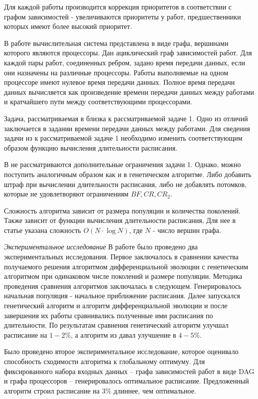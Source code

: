 \documentclass{article}
\begin{document}
Для каждой работы производится коррекция приоритетов в соответствии с графом зависимостей - увеличиваются приоритеты у работ, предшественники которых имеют более высокий приоритет. \par
В работе \cite{Krzysztof_2005} вычислительная система представлена в виде графа, вершинами которого являются процессоры. Дан ациклический граф зависимостей работ. Для каждой пары работ, соединенных ребром, задано время передачи данных, если они назначены на различные процессоры. Работы выполняемые на одном процессоре имеют нулевое время передачи данных. Полное время передачи данных вычисляется как произведение времени передачи данных между работами и кратчайшего пути между соответствующими процессорами.\par
Задача, рассматриваемая в \cite{Krzysztof_2005} близка к рассматриваемой задаче 1. Одно из отличий заключается в задании времени передачи данных между работами. Для сведения задачи из \cite{Krzysztof_2005} к рассматриваемой задаче 1 необходимо изменить соответствующим образом функцию вычисления длительности расписания. \par
В \cite{Krzysztof_2005} не рассматриваются дополнительные ограничения задачи 1. Однако, можно поступить аналогичным образом как и в генетическом алгоритме. Либо добавить штраф при вычислении длительности расписания, либо не добавлять потомков, которые не удовлетворяют ограничениям $BF, CR, CR_2$. \par
Сложность алгоритма зависит от размера популяции и количества поколений. Также зависит от функции вычисления длительности расписания, Для нее в статье указана сложность $O\left( N \cdot \log{N} \right)$, где $N$ - число вершин графа. \par
\textit{Экспериментальное исследование}
В работе \cite{Krzysztof_2005} было проведено два экспериментальных исследования. Первое заключалось в сравнении качества получаемого решения алгоритмом дифференциальной эволюции с генетическим алгоритмом при одинаковом числе поколений и размере популяции. Методика проведения сравнения алгоритмов заключалась в следующем. Генерировалось начальная популяция - начальное приближение расписания. Далее запускался генетический алгоритм и алгоритм дифференциальной эволюции и после завершения их работы сравнивались полученные ими расписания по длительности. По результатам сравнения генетический алгоритм улучшал расписание на $1-2\%$, а алгоритм из \cite{Krzysztof_2005} давал улучшение в $4-5\%$. \par
Было проведено второе экспериментальное исследование, которое оценивало способность сходимости алгоритма к глобальному оптимуму. Для фиксированного набора входных данных – графа зависимостей работ в виде DAG и графа процессоров – генерировалось оптимальное расписание. Предложенный алгоритм строил расписание на $3\%$ длиннее, чем оптимальное. \par
\end{document}
